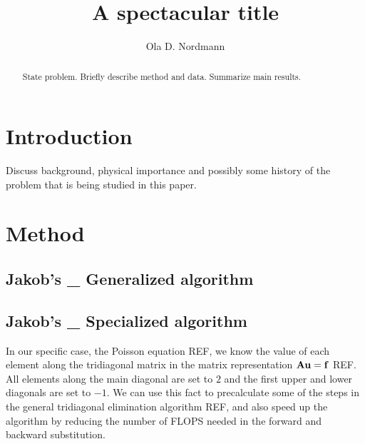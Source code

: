 \documentclass{emulateapj}
\begin{document}
\title{A spectacular title}

\author{Ola D. Nordmann}





\begin{abstract}
  State problem. Briefly describe method and data. Summarize main results.
\end{abstract}

\section{Introduction}
\label{sec:introduction}

Discuss background, physical importance and possibly some history of
the problem that is being studied in this paper.


\section{Method}
\label{sec:method}

\subsection*{Jakob's \_ Generalized algorithm}

\subsection*{Jakob's \_ Specialized algorithm}
In our specific case, the Poisson equation REF, we know the value of each element along the tridiagonal matrix in the matrix representation $\vb{A}\vb{u} = \vb{f}$ REF. All elements along the main diagonal are set to $2$ and the first upper and lower diagonals are set to $-1$. We can use this fact to precalculate some of the steps in the general tridiagonal elimination algorithm REF, and also speed up the algorithm by reducing the number of FLOPS needed in the forward and backward substitution.
\end{document}
